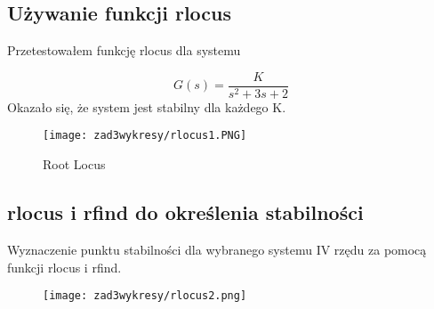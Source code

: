 \subsection{Używanie funkcji rlocus}

Przetestowałem funkcję rlocus dla systemu

	\LARGE
	\begin{equation}
	G(s) = \frac{K}{s^{2} + 3s + 2}
	\end{equation}
	\normalsize
	Okazało się, że system jest stabilny dla każdego K.

	\begin{figure}[H]
    \centering
    \texttt{[image: zad3wykresy/rlocus1.PNG]}
    \caption{Root Locus}
    \label{lamana}
	\end{figure}
\newpage	
\subsection{rlocus i rfind do określenia stabilności}

Wyznaczenie punktu stabilności dla wybranego systemu IV rzędu za pomocą funkcji rlocus i rfind.

	\begin{figure}[H]
    \centering
    \texttt{[image: zad3wykresy/rlocus2.png]}
    \label{lamana}
	\end{figure}